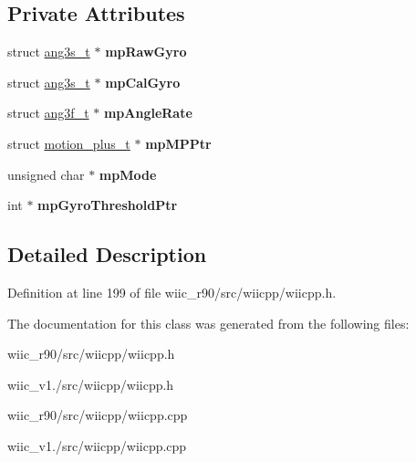 \subsection*{Private Attributes}
\begin{DoxyCompactItemize}
\item 
\hypertarget{class_c_gyroscope_ac4229305ac150cf359082fe708336af9}{struct \hyperlink{structang3s__t}{ang3s\-\_\-t} $\ast$ {\bfseries mp\-Raw\-Gyro}}\label{class_c_gyroscope_ac4229305ac150cf359082fe708336af9}

\item 
\hypertarget{class_c_gyroscope_a00a4de415b74521390ec9b3c6bfa0fde}{struct \hyperlink{structang3s__t}{ang3s\-\_\-t} $\ast$ {\bfseries mp\-Cal\-Gyro}}\label{class_c_gyroscope_a00a4de415b74521390ec9b3c6bfa0fde}

\item 
\hypertarget{class_c_gyroscope_af44240882543f06a3d7d1a5c0dc3ce03}{struct \hyperlink{structang3f__t}{ang3f\-\_\-t} $\ast$ {\bfseries mp\-Angle\-Rate}}\label{class_c_gyroscope_af44240882543f06a3d7d1a5c0dc3ce03}

\item 
\hypertarget{class_c_gyroscope_afdef0558135f7eea39a9477d2fce8a68}{struct \hyperlink{structmotion__plus__t}{motion\-\_\-plus\-\_\-t} $\ast$ {\bfseries mp\-M\-P\-Ptr}}\label{class_c_gyroscope_afdef0558135f7eea39a9477d2fce8a68}

\item 
\hypertarget{class_c_gyroscope_a03bdcb069bf9bed619fe4a687186a394}{unsigned char $\ast$ {\bfseries mp\-Mode}}\label{class_c_gyroscope_a03bdcb069bf9bed619fe4a687186a394}

\item 
\hypertarget{class_c_gyroscope_a80021d082980e7d321ae57f445507bfb}{int $\ast$ {\bfseries mp\-Gyro\-Threshold\-Ptr}}\label{class_c_gyroscope_a80021d082980e7d321ae57f445507bfb}

\end{DoxyCompactItemize}


\subsection{Detailed Description}


Definition at line 199 of file wiic\-\_\-r90/src/wiicpp/wiicpp.\-h.



The documentation for this class was generated from the following files\-:\begin{DoxyCompactItemize}
\item 
wiic\-\_\-r90/src/wiicpp/wiicpp.\-h\item 
wiic\-\_\-v1./src/wiicpp/wiicpp.\-h\item 
wiic\-\_\-r90/src/wiicpp/wiicpp.\-cpp\item 
wiic\-\_\-v1./src/wiicpp/wiicpp.\-cpp\end{DoxyCompactItemize}
